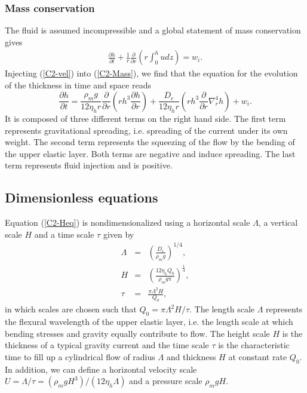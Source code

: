 \subsubsection*{Mass conservation}

The fluid  is assumed  incompressible and a  global statement  of mass
conservation gives
\begin{eqnarray}
  \frac{\partial         h}{\partial        t} +\frac{1}{r}
  \frac{\partial}{\partial
  r} \left( r\int_0^hudz\right) = w_i.
  \label{C2-Mass}
\end{eqnarray}
Injecting  (\ref{C2-vel})  into  (\ref{C2-Mass}),  we  find  that  the
equation for the evolution of the thickness in time and space reads
\begin{equation}
  \frac{\partial h}{\partial t} =\frac{\rho_mg}{12 \eta_h r}
  \frac{\partial}{\partial r}  \left( rh^3  \frac{\partial h}{\partial
      r}\right)+\frac{D_e}{12\eta_h r} \left( rh^3 \frac{\partial}{\partial r}\nabla_r^4h\right)+
  w_i .\label{C2-Heq}
\end{equation}
It is  composed of three different  terms on the right  hand side. The
first term represents gravitational  spreading, i.e.  spreading of the
current under its own weight. The second term represents the squeezing
of the flow by the bending of the upper elastic layer.  Both terms are negative and
induce spreading.   The last term  represents fluid injection  and is
positive.

\subsection{Dimensionless equations}
\label{C2-sec:dimens-equat}

Equation (\ref{C2-Heq}) is nondimensionalized using a horizontal scale
$\Lambda$, a vertical scale $H$ and a time scale $\tau$ given by
\begin{eqnarray}
  \Lambda &=& \left(\frac{D_e}{\rho_m g}\right)^{1/4},\label{C2-L1}\\
  H&=&\left       (\frac{12\eta_h      Q_{0}}{\rho_{m}g       \pi}\right      )
       ^{\frac{1}{4}} ,\label{C2-H1}\\
  \tau&=&\frac{\pi \Lambda^{2} H}{Q_{0}},\label{C2-T1}
\end{eqnarray}
in which scales are chosen such  that $Q_0 = \pi\Lambda^2 H/\tau$. The
length scale $\Lambda$ represents the flexural wavelength of the upper
elastic layer,  i.e. the  length scale at  which bending  stresses and
gravity  equally contribute  to flow.   The  height scale  $H$ is  the
thickness of  a typical gravity current  and the time scale  $\tau$ is
the  characteristic time  to  fill  up a  cylindrical  flow of  radius
$\Lambda$ and thickness  $H$ at constant rate $Q_0$.   In addition, we
can       define        a       horizontal        velocity       scale
$U=\Lambda/\tau=\left(\rho_m           g           H^3\right)/\left(12
  \eta_h\Lambda\right)$ and a pressure scale $\rho_m g H$.

